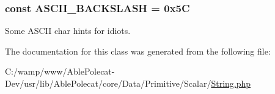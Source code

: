 \subsubsection[{A\+S\+C\+I\+I\+\_\+\+B\+A\+C\+K\+S\+L\+A\+S\+H}]{\setlength{\rightskip}{0pt plus 5cm}const A\+S\+C\+I\+I\+\_\+\+B\+A\+C\+K\+S\+L\+A\+S\+H = 0x5\+C}\label{class_able_polecat___data___primitive___scalar___string_a325270274e54b22cda0ff9e990b67bdf}
Some A\+S\+C\+I\+I char \textquotesingle{}hints\textquotesingle{} for idiots. 

The documentation for this class was generated from the following file\+:\begin{DoxyCompactItemize}
\item 
C\+:/wamp/www/\+Able\+Polecat-\/\+Dev/usr/lib/\+Able\+Polecat/core/\+Data/\+Primitive/\+Scalar/\hyperlink{_string_8php}{String.\+php}\end{DoxyCompactItemize}
